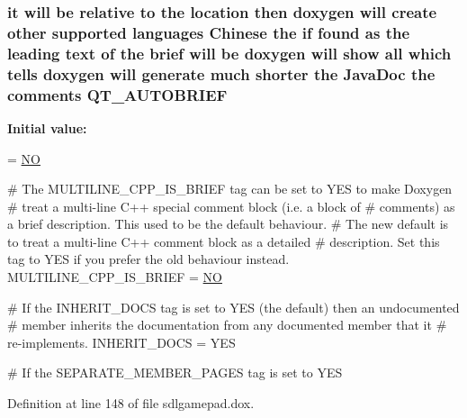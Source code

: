\hypertarget{sdlgamepad_8dox_ac0b206976e7e9c2197ff6f4a6104ed56}{
\subsubsection[{Q\-T\-\_\-\-A\-U\-T\-O\-B\-R\-I\-E\-F}]{\setlength{\rightskip}{0pt plus 5cm}it will be relative to the {\bf location} then doxygen will create other supported languages {\bf Chinese} the {\bf if} found as the leading text of the brief will be doxygen will show all which tells doxygen will generate much shorter the Java\-Doc the comments Q\-T\-\_\-\-A\-U\-T\-O\-B\-R\-I\-E\-F}}\label{sdlgamepad_8dox_ac0b206976e7e9c2197ff6f4a6104ed56}
{\bfseries Initial value\-:}
\begin{DoxyCode}
= \hyperlink{sdlgamepad_8dox_a0f6a46245280dc38baf9600906aa1393}{NO}

\textcolor{preprocessor}{# The MULTILINE\_CPP\_IS\_BRIEF tag can be set to YES to make Doxygen}
\textcolor{preprocessor}{}\textcolor{preprocessor}{# treat a multi-line C++ special comment block (i.e. a block of }
\textcolor{preprocessor}{}\textcolor{preprocessor}{# comments) as a brief description. This used to be the default behaviour.}
\textcolor{preprocessor}{}\textcolor{preprocessor}{# The new default is to treat a multi-line C++ comment block as a detailed}
\textcolor{preprocessor}{}\textcolor{preprocessor}{# description. Set this tag to YES if you prefer the old behaviour instead.}
\textcolor{preprocessor}{}
MULTILINE\_CPP\_IS\_BRIEF = \hyperlink{sdlgamepad_8dox_a0f6a46245280dc38baf9600906aa1393}{NO}

\textcolor{preprocessor}{# If the INHERIT\_DOCS tag is set to YES (the default) then an undocumented}
\textcolor{preprocessor}{}\textcolor{preprocessor}{# member inherits the documentation from any documented member that it}
\textcolor{preprocessor}{}\textcolor{preprocessor}{# re-implements.}
\textcolor{preprocessor}{}
INHERIT\_DOCS           = YES

\textcolor{preprocessor}{# If the SEPARATE\_MEMBER\_PAGES tag is set to YES}
\end{DoxyCode}


Definition at line 148 of file sdlgamepad.\-dox.


